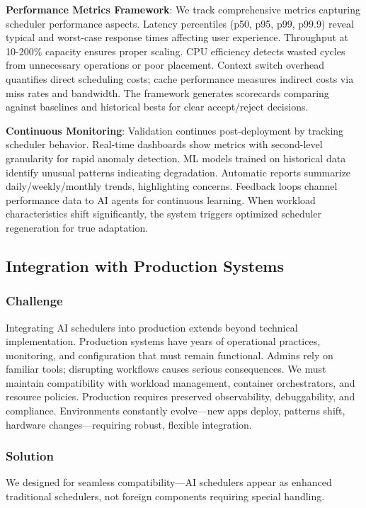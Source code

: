 \textbf{Performance Metrics Framework}: We track comprehensive metrics capturing scheduler performance aspects. Latency percentiles (p50, p95, p99, p99.9) reveal typical and worst-case response times affecting user experience. Throughput at 10-200\% capacity ensures proper scaling. CPU efficiency detects wasted cycles from unnecessary operations or poor placement. Context switch overhead quantifies direct scheduling costs; cache performance measures indirect costs via miss rates and bandwidth. The framework generates scorecards comparing against baselines and historical bests for clear accept/reject decisions.

\textbf{Continuous Monitoring}: Validation continues post-deployment by tracking scheduler behavior. Real-time dashboards show metrics with second-level granularity for rapid anomaly detection. ML models trained on historical data identify unusual patterns indicating degradation. Automatic reports summarize daily/weekly/monthly trends, highlighting concerns. Feedback loops channel performance data to AI agents for continuous learning. When workload characteristics shift significantly, the system triggers optimized scheduler regeneration for true adaptation.

\subsection{Integration with Production Systems}

\subsubsection{Challenge}
Integrating AI schedulers into production extends beyond technical implementation. Production systems have years of operational practices, monitoring, and configuration that must remain functional. Admins rely on familiar tools; disrupting workflows causes serious consequences. We must maintain compatibility with workload management, container orchestrators, and resource policies. Production requires preserved observability, debuggability, and compliance. Environments constantly evolve—new apps deploy, patterns shift, hardware changes—requiring robust, flexible integration.

\subsubsection{Solution}
We designed for seamless compatibility—AI schedulers appear as enhanced traditional schedulers, not foreign components requiring special handling.


